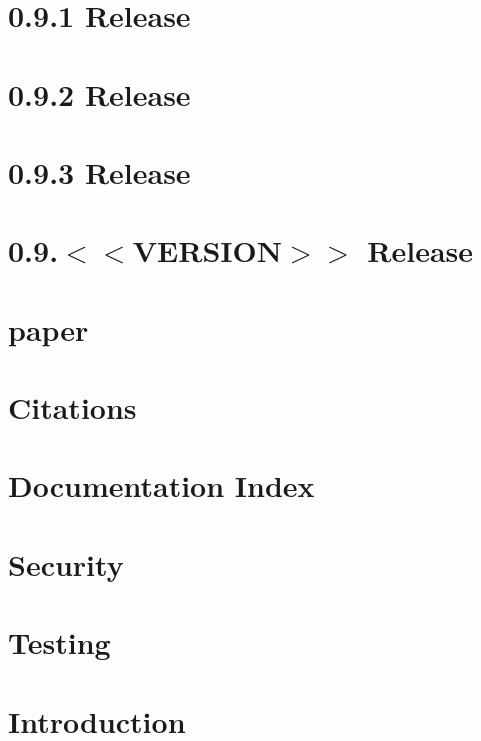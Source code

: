 \documentclass[twoside]{book}
\newcommand{\+}{\discretionary{\mbox{\scriptsize$\hookleftarrow$}}{}{}}
\begin{document}
\chapter{0.9.1 Release}
\label{doc_news_2019-11-26_0_9_1_md}

\chapter{0.9.2 Release}
\label{doc_news_2020-05-26_0_9_2_md}

\chapter{0.9.3 Release}
\label{doc_news_2020-10-31_0_9_3_md}

\chapter{0.9.$<$$<$V\+E\+R\+S\+I\+ON$>$$>$ Release}
\label{doc_news__preparation_next_release_md}

\chapter{paper}
\label{md_doc_paper_paper}

\chapter{Citations}
\label{doc_paper_README_md}

\chapter{Documentation Index}
\label{doc_README_md}

\chapter{Security}
\label{doc_SECURITY_md}

\chapter{Testing}
\label{doc_TESTING_md}

\chapter{Introduction}
\label{doc_tutorials_application-integration_md}

\end{document}
